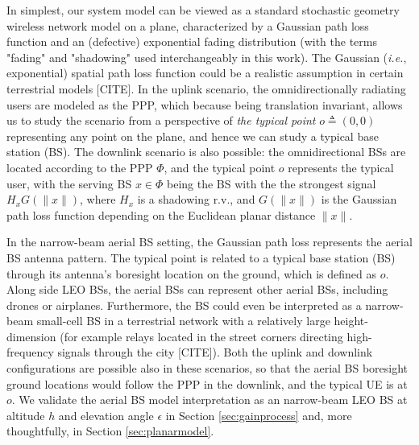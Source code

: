\documentclass[lettersize,journal]{IEEEtran}
\begin{document}
In simplest, our system model can be viewed as a standard stochastic geometry wireless network model on a plane, characterized by a Gaussian path loss function and an (defective) exponential fading distribution (with the terms "fading" and "shadowing" used interchangeably in this work). The Gaussian (\textit{i.e.}, exponential) spatial path loss function could be a realistic assumption in certain terrestrial models [CITE]. In the uplink scenario, the omnidirectionally radiating users are modeled as the PPP, which because being translation invariant, allows us to study the scenario from a perspective of \textit{the typical point} $\textit{o} \triangleq (0,0)$ representing any point on the plane, and hence we can study a typical base station (BS). The downlink scenario is also possible: the omnidirectional BSs are located according to the PPP $\Phi$, and the typical point $\textit{o}$ represents the typical user, with the serving BS $x \in \Phi$ being the BS with the the strongest signal $H_xG(\|x\|)$, where $H_x$ is a shadowing r.v., and $G(\|x\|)$ is the Gaussian path loss function depending on the Euclidean planar distance $\|x\|$.

In the narrow-beam aerial BS setting, the Gaussian path loss represents the aerial BS antenna pattern. The typical point is related to a typical base station (BS) through its antenna's boresight location on the ground, which is defined as $\textit{o}$. Along side LEO BSs, the aerial BSs can represent other aerial BSs, including drones or airplanes. Furthermore, the BS could even be interpreted as a narrow-beam small-cell BS in a terrestrial network with a relatively large height-dimension (for example relays located in the street corners directing high-frequency signals through the city [CITE]). Both the uplink and downlink configurations are possible also in these scenarios, so that the aerial BS boresight ground locations would follow the PPP in the downlink, and the typical UE is at $\textit{o}$. We validate the aerial BS model interpretation as an narrow-beam LEO BS at altitude $h$ and elevation angle $\epsilon$ in Section \ref{sec:gainprocess} and, more thoughtfully, in Section \ref{sec:planarmodel}.
\end{document}
